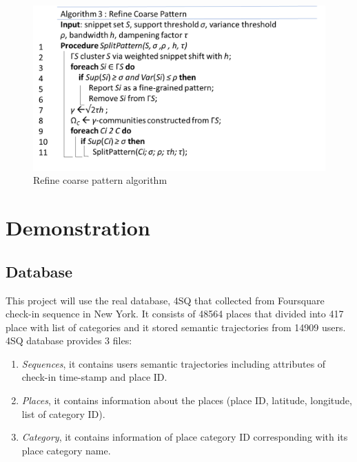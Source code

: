 \documentclass[conference]{IEEEtran}
\begin{document}
\begin{figure}[!h]
	\centering
	\includegraphics[width=1\linewidth]{"refine coarse"}
	\caption{Refine coarse pattern algorithm \cite{zhang2014splitter}}
	\label{fig:refine-coarse}
\end{figure}

\section{Demonstration}

\subsection{Database}
This project will use the real database, 4SQ that collected from Foursquare check-in sequence in New York. It consists of 48564 places that divided into 417 place with list of categories and it stored semantic trajectories from 14909 users. 4SQ database provides 3 files:
\begin{enumerate}
\item \textit{Sequences}, it contains users semantic trajectories including attributes of check-in time-stamp and place ID.
\item \textit{Places}, it contains information about the places (place ID, latitude, longitude, list of category ID).
\item \textit{Category}, it contains information of place category ID corresponding with its place category name.
\end{enumerate}
\end{document}
